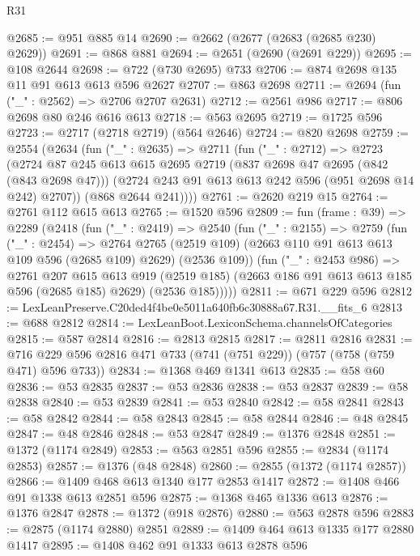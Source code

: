 \begin{lexlean}{R31}
\begin{coremodule}
@2685 := @951 @885 @14
@2690 := @2662 (@2677 (@2683 (@2685 @230) @2629))
@2691 := @868 @881
@2694 := @2651 (@2690 (@2691 @229))
@2695 := @108 @2644
@2698 := @722 (@730 @2695) @733
@2706 := @874 @2698 @135 @11 @91 @613 @613 @596 @2627
@2707 := @863 @2698
@2711 := @2694 (fun ("_" : @2562) => @2706 @2707 @2631)
@2712 := @2561 @986
@2717 := @806 @2698 @80 @246 @616 @613
@2718 := @563 @2695
@2719 := @1725 @596
@2723 := @2717 (@2718 @2719) (@564 @2646)
@2724 := @820 @2698
@2759 := @2554
    (@2634
      (fun ("_" : @2635) =>
      @2711
        (fun ("_" : @2712) =>
        @2723
          (@2724
            @87
            @245
            @613
            @615
            @2695
            @2719
            (@837 @2698 @47 @2695 (@842 (@843 @2698 @47)))
            (@2724 @243 @91 @613 @613 @242 @596 (@951 @2698 @14 @242) @2707))
          (@868 @2644 @241))))
@2761 := @2620 @219 @15
@2764 := @2761 @112 @615 @613
@2765 := @1520 @596
@2809 := fun (frame : @39) =>
  @2289
    (@2418
      (fun ("_" : @2419) =>
      @2540
        (fun ("_" : @2155) =>
        @2759
          (fun ("_" : @2454) =>
          @2764
            @2765
            (@2519 @109)
            (@2663 @110 @91 @613 @613 @109 @596 (@2685 @109) @2629)
            (@2536 @109))
          (fun ("_" : @2453 @986) =>
          @2761
            @207
            @615
            @613
            @919
            (@2519 @185)
            (@2663 @186 @91 @613 @613 @185 @596 (@2685 @185) @2629)
            (@2536 @185)))))
@2811 := @671 @229 @596
@2812 := LexLeanPreserve.C20ded4f4be0e5011a640fb6c30888a67.R31.__fits_6
@2813 := @688 @2812
@2814 := LexLeanBoot.LexiconSchema.channelsOfCategories
@2815 := @587 @2814
@2816 := @2813 @2815
@2817 := @2811 @2816
@2831 := @716 @229 @596 @2816 @471 @733 (@741 (@751 @229)) (@757 (@758 (@759 @471) @596 @733))
@2834 := @1368 @469 @1341 @613
@2835 := @58 @60
@2836 := @53 @2835
@2837 := @53 @2836
@2838 := @53 @2837
@2839 := @58 @2838
@2840 := @53 @2839
@2841 := @53 @2840
@2842 := @58 @2841
@2843 := @58 @2842
@2844 := @58 @2843
@2845 := @58 @2844
@2846 := @48 @2845
@2847 := @48 @2846
@2848 := @53 @2847
@2849 := @1376 @2848
@2851 := @1372 (@1174 @2849)
@2853 := @563 @2851 @596
@2855 := @2834 (@1174 @2853)
@2857 := @1376 (@48 @2848)
@2860 := @2855 (@1372 (@1174 @2857))
@2866 := @1409 @468 @613 @1340 @177 @2853 @1417
@2872 := @1408 @466 @91 @1338 @613 @2851 @596
@2875 := @1368 @465 @1336 @613
@2876 := @1376 @2847
@2878 := @1372 (@918 @2876)
@2880 := @563 @2878 @596
@2883 := @2875 (@1174 @2880) @2851
@2889 := @1409 @464 @613 @1335 @177 @2880 @1417
@2895 := @1408 @462 @91 @1333 @613 @2878 @596

\end{coremodule}
\end{lexlean}
